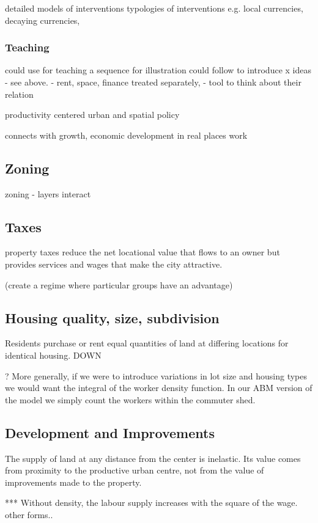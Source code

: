 detailed models of interventions typologies of interventions e.g. local currencies, decaying currencies, 

\subsubsection{Teaching}
could use for teaching a sequence for illustration could follow to introduce x ideas - see above. - rent, space, finance treated separately, - tool to think about their relation

productivity centered urban and spatial policy

connects with growth, economic development in real places work

\subsection{Zoning}
zoning - layers interact

\subsection{Taxes}
property taxes reduce the net locational value that flows to an owner but provides services and wages that make the city attractive. 

(create a regime where particular groups have an advantage)

\subsection{Housing quality, size, subdivision}
Residents  purchase or rent equal quantities of land at differing locations %
for identical housing.  DOWN

? More generally, if we were to introduce variations in lot size and housing types  we would want the integral of the worker density function. In our ABM version  of the model we simply count the workers within the commuter shed.

\subsection{Development and Improvements}
The supply of land at any distance from the center is inelastic. 
Its value comes from proximity to the productive urban centre, not from the value of improvements made to the property.

*** Without density, the labour supply increases with the square of the wage.  other forms..

